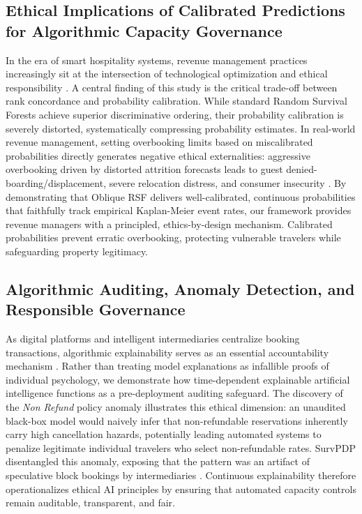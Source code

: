 \documentclass[pdflatex,iicol,sn-mathphys-ay]{sn-jnl}
\theoremstyle{thmstyleone}%
\theoremstyle{thmstyletwo}%
\theoremstyle{thmstylethree}%
\begin{document}
\subsection{Ethical Implications of Calibrated Predictions for Algorithmic Capacity Governance}
In the era of smart hospitality systems, revenue management practices increasingly sit at the intersection of technological optimization and ethical responsibility \citep{law2025ethical}. A central finding of this study is the critical trade-off between rank concordance and probability calibration. While standard Random Survival Forests achieve superior discriminative ordering, their probability calibration is severely distorted, systematically compressing probability estimates. In real-world revenue management, setting overbooking limits based on miscalibrated probabilities directly generates negative ethical externalities: aggressive overbooking driven by distorted attrition forecasts leads to guest denied-boarding/displacement, severe relocation distress, and consumer insecurity \citep{lin2026developing}. By demonstrating that Oblique RSF delivers well-calibrated, continuous probabilities that faithfully track empirical Kaplan-Meier event rates, our framework provides revenue managers with a principled, ethics-by-design mechanism. Calibrated probabilities prevent erratic overbooking, protecting vulnerable travelers while safeguarding property legitimacy.

\subsection{Algorithmic Auditing, Anomaly Detection, and Responsible Governance}
As digital platforms and intelligent intermediaries centralize booking transactions, algorithmic explainability serves as an essential accountability mechanism \citep{dwivedi2025artificial, meske2022explainable}. Rather than treating model explanations as infallible proofs of individual psychology, we demonstrate how time-dependent explainable artificial intelligence functions as a pre-deployment auditing safeguard. The discovery of the \textit{Non Refund} policy anomaly illustrates this ethical dimension: an unaudited black-box model would naively infer that non-refundable reservations inherently carry high cancellation hazards, potentially leading automated systems to penalize legitimate individual travelers who select non-refundable rates. SurvPDP disentangled this anomaly, exposing that the pattern was an artifact of speculative block bookings by intermediaries \citep{antonio2019data}. Continuous explainability therefore operationalizes ethical AI principles by ensuring that automated capacity controls remain auditable, transparent, and fair.
\end{document}
